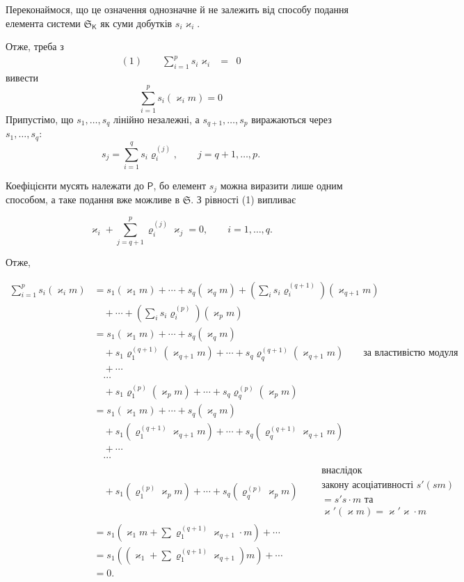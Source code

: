 \documentclass[11pt]{article}
\begin{document}
Переконаймося, що це означення однозначне й не залежить від способу подання елемента системи \(\mathfrak S_{\mathsf K}\) як суми добутків \(s_i\varkappa _i\).

Отже, треба з
\[
\begin{array}{rcl}
(1)\qquad \displaystyle\sum_{i=1}^{p}s_i\varkappa _i&=&0
\end{array}
\]
вивести
\[
\sum_{i=1}^{p}s_i(\varkappa _i m)=0
\]
Припустімо, що \(s_1,\ldots,s_q\) лінійно незалежні, а \(s_{q+1},\ldots,s_p\) виражаються через \(s_1,\ldots,s_q\):
\[
s_j=\sum_{i=1}^{q}s_i\varrho_i^{(j)},\qquad j=q+1,\ldots,p.
\]

Коефіцієнти мусять належати до \(\mathsf P\), бо елемент \(s_j\) можна виразити лише одним способом, а таке подання вже можливе в \(\mathfrak S\). З рівності (1) випливає

\[
\varkappa _i+\sum_{j=q+1}^{p}\varrho_i^{(j)}\varkappa _j=0,\qquad i=1,\ldots,q.
\]

Отже,

\[
\begin{aligned}
\sum_{i=1}^{p}s_i(\varkappa _i m)
&=s_1(\varkappa _1m)+\cdots+s_q(\varkappa _qm)
  +\left(\sum_i s_i\varrho_i^{(q+1)}\right)(\varkappa _{q+1}m)\\
&\quad+\cdots+\left(\sum_i s_i\varrho_i^{(p)}\right)(\varkappa _pm)\\
&=s_1(\varkappa _1m)+\cdots+s_q(\varkappa _qm)\\
&\quad+s_1\varrho_1^{(q+1)}(\varkappa _{q+1}m)+\cdots+s_q\varrho_q^{(q+1)}(\varkappa _{q+1}m)
  \qquad\text{за властивістю модуля}\\
&\quad+\cdots\\
&\quad\cdots\\
&\quad+s_1\varrho_1^{(p)}(\varkappa _pm)+\cdots+s_q\varrho_q^{(p)}(\varkappa _pm)\\
&=s_1(\varkappa _1m)+\cdots+s_q(\varkappa _qm)\\
&\quad+s_1(\varrho_1^{(q+1)}\varkappa _{q+1}m)+\cdots+s_q(\varrho_q^{(q+1)}\varkappa _{q+1}m)\\
&\quad+\cdots\\
&\quad\cdots\\
&\quad+s_1(\varrho_1^{(p)}\varkappa _pm)+\cdots+s_q(\varrho_q^{(p)}\varkappa _pm)
  \qquad\begin{gathered}\text{внаслідок}\\ \text{закону асоціативності }s'(sm)\\ =s's\cdot m\text{ та}\\ \varkappa '(\varkappa m)=\varkappa '\varkappa \cdot m\end{gathered}\\
&=s_1\left(\varkappa _1m+\sum\varrho_1^{(q+1)}\varkappa _{q+1}\cdot m\right)+\cdots\\
&=s_1\left(\left(\varkappa _1+\sum\varrho_1^{(q+1)}\varkappa _{q+1}\right)m\right)+\cdots\\
&=0.
\end{aligned}
\]
\end{document}
